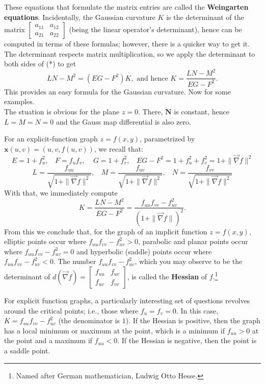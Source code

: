 \documentclass[leqno]{book}
\begin{document}
These equations that formulate the matrix entries are called the \textbf{Weingarten equations}.  Incidentally, the Gaussian curvature $K$ is the determinant of the matrix $\begin{bmatrix}a_{11}&a_{12}\\a_{21}&a_{22}\end{bmatrix}$ (being the linear operator's determinant), hence can be computed in terms of these formulas; however, there is a quicker way to get it.  The determinant respects matrix multiplication, so we apply the determinant to both sides of (*) to get
$$LN-M^2=(EG-F^2)K,\text{ and hence }K=\frac{LN-M^2}{EG-F^2}.$$
This provides an easy formula for the Gaussian curvature.  Now for some examples.\\

\noindent The stuation is obvious for the plane $z=0$.  There, $\mathbf N$ is constant, hence $L=M=N=0$ and the Gauss map differential is also zero.

For an explicit-function graph $z=f(x,y)$, parametrized by $\mathbf x(u,v)=(u,v,f(u,v))$, we recall that:
$$E=1+f_u^2,~~~~F=f_uf_v,~~~~~G=1+f_v^2,~~~~EG-F^2=1+f_u^2+f_v^2=1+\|\vec\nabla f\|^2$$
$$L=\frac{f_{uu}}{\sqrt{1+\|\vec\nabla f\|^2}},~~~~M=\frac{f_{uv}}{\sqrt{1+\|\vec\nabla f\|^2}},~~~~N=\frac{f_{vv}}{\sqrt{1+\|\vec\nabla f\|^2}}$$
With that, we immediately compute
$$K=\frac{LN-M^2}{EG-F^2}=\frac{f_{uu}f_{vv}-f_{uv}^2}{(1+\|\vec\nabla f\|)^2}.$$
From this we conclude that, for the graph of an implicit function $z=f(x,y)$, elliptic points occur where $f_{uu}f_{vv}-f_{uv}^2>0$, parabolic and planar points occur where $f_{uu}f_{vv}-f_{uv}^2=0$ and hyperbolic (saddle) points occur where $f_{uu}f_{vv}-f_{uv}^2<0$.  The number $f_{uu}f_{vv}-f_{uv}^2$, which you may observe to be the determinant of $d(\vec\nabla f)=\begin{bmatrix}f_{uu}&f_{uv}\\f_{uv}&f_{vv}\end{bmatrix}$, is called the \textbf{Hessian} of $f$.\footnote{Named after German mathematician, Ludwig Otto Hesse.}

For explicit function graphs, a particularly interesting set of questions revolves around the critical points; i.e., those where $f_u=f_v=0$.  In this case, $K=f_{uu}f_{vv}-f_{uv}^2$ (the denominator is $1$).  If the Hessian is positive, then the graph has a local minimum or maximum at the point, which is a minimum if $f_{uu}>0$ at the point and a maximum if $f_{uu}<0$.  If the Hessian is negative, then the point is a saddle point. %
\end{document}
